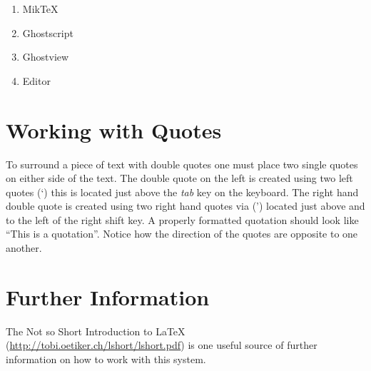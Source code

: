 \begin{enumerate}
  \item MikTeX
  \item Ghostscript
  \item Ghostview
  \item Editor
\end{enumerate}

\section{Working with Quotes}
To surround a piece of text with double quotes one must place two single quotes on either side of the text. The double quote on the left is created using two left quotes (\lq) this is located just above the \emph{tab} key on the keyboard. The right hand double quote is created using two right hand quotes via (\rq) located just above and to the left of the right shift key. A properly formatted quotation should look like ``This is a quotation''. Notice how the direction of the quotes are opposite to one another.

\section{Further Information}
The Not so Short Introduction to LaTeX (\url{http://tobi.oetiker.ch/lshort/lshort.pdf}) is one useful source of further information on how to work with this system.